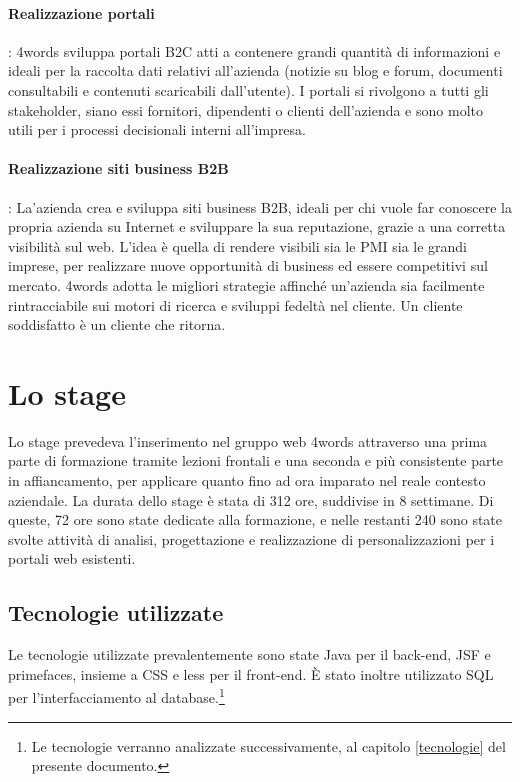 \paragraph{Realizzazione portali}: 4words sviluppa portali B2C atti a contenere grandi quantità di informazioni e ideali per la raccolta dati relativi all'azienda (notizie su blog e forum, documenti consultabili e contenuti scaricabili dall'utente). I portali si rivolgono a tutti gli \gls{stakeholder}, siano essi fornitori, dipendenti o clienti dell'azienda e sono molto utili per i processi decisionali interni all'impresa.

\paragraph{Realizzazione siti business B2B}: La'azienda crea e sviluppa siti business B2B, ideali per chi vuole far conoscere la propria azienda su Internet e sviluppare la sua reputazione, grazie a una corretta visibilità sul web.
L'idea è quella di rendere visibili sia le PMI sia le grandi imprese, per realizzare nuove opportunità di business ed essere competitivi sul mercato. 4words adotta le migliori strategie affinché un'azienda sia facilmente rintracciabile sui motori di ricerca e sviluppi fedeltà nel cliente. Un cliente soddisfatto è un cliente che ritorna.

\section{Lo stage}
Lo stage prevedeva l'inserimento nel gruppo web 4words attraverso una prima parte di formazione tramite lezioni frontali e una seconda e più consistente parte in affiancamento, per applicare quanto fino ad ora imparato nel reale contesto aziendale. La durata dello stage è stata di 312 ore, suddivise in 8 settimane. Di queste, 72 ore sono state dedicate alla formazione, e nelle restanti 240 sono state svolte attività di analisi, progettazione e realizzazione di personalizzazioni per i portali web esistenti.

\subsection{Tecnologie utilizzate}
Le tecnologie utilizzate prevalentemente sono state Java per il back-end, \Gls{JSF} e \Gls{primefaces}, insieme a \acrshort{CSS} e \Gls{less} per il front-end. È stato inoltre utilizzato SQL per l'interfacciamento al database.\footnote{Le tecnologie verranno analizzate successivamente, al capitolo \ref{tecnologie} del presente documento.}